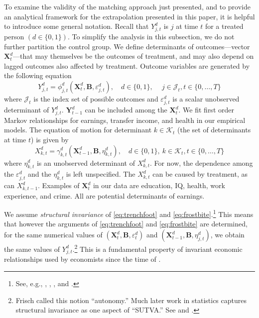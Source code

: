 To examine the validity of the matching approach just presented, and to provide an analytical framework for the extrapolation presented in this paper, it is helpful to introduce some general notation. Recall that $Y^d_{j,t}$ is $j$ at time $t$ for a treated person $(d\in\{0,1\})$. To simplify the analysis in this subsection, we do not further partition the control group. We define determinants of outcomes---vector $\bm{X}^d_t$---that may themselves be the outcomes of treatment, and may also depend on lagged outcomes also affected by treatment. Outcome variables are generated by the following equation
\begin{equation}\label{eq:trenchfoot}
Y^d_{j,t} = \phi^d_{j,t} (\bm{X}^d_t, \bm{B}, \varepsilon^d_{j,t}), \quad d \in \{0,1\}, \quad \  j \in \mathcal{J}_t, t \in \{0,\dots,T\}
\end{equation}
where $\mathcal{J}_t$ is the index set of possible outcomes and $\varepsilon^d_{j,t}$ is a scalar unobserved determinant of $Y^d_{j,t}$. $\bm{Y}^d_{t-1}$ can be included among the $\bm{X}^d_{t}$. We fit first order Markov relationships for earnings, transfer income, and health in our empirical models. The equation of motion for determinant $k \in \mathcal{K}_t$ (the set of determinants at time $t$) is given by
\begin{equation}\label{eq:frostbite}
X^d_{k,t} = \gamma^d_{k,t} (\bm{X}^d_{t-1}, \bm{B}, \eta^d_{k,t}), \quad d \in \{0,1\}, \ k \in \mathcal{K}_t, t \in \{0,\dots,T\}
\end{equation}
where $\eta^d_{k,t}$ is an unobserved determinant of $X^d_{k,t}$. For now, the dependence among the $\varepsilon^d_{j,t}$ and the $\eta^d_{k,t}$ is left unspecified. The $X^d_{k,t}$ can be caused by treatment, as can $X^d_{k,t-1}$. Examples of $\bm{X}^d_t$ in our data are education, IQ, health, work experience, and crime. All are potential determinants of earnings.

We assume \emph{structural invariance} of \eqref{eq:trenchfoot} and \eqref{eq:frostbite}.\footnote{See, e.g., \citet{Frisch_1938_autonomy}, \citet{Haavelmo_1943_Econometrica,Haavelmo_1944_Econometrica}, \citet{Hurwicz_1962_structural}, and \citet{Heckman_Pinto_2015_EconometTheory}.} This means that however the arguments of \eqref{eq:trenchfoot} and \eqref{eq:frostbite} are determined, for the same numerical values of $(\bm{X}^d_t, \bm{B}, \varepsilon^d_t)$ and $(\bm{X}^d_{t-1}, \bm{B}, \eta^d_{j,t})$, we obtain the same values of $Y^d_{j,t}$.\footnote{Frisch called this notion ``autonomy.'' Much later work in statistics captures structural invariance as one aspect of ``SUTVA.'' See \citet{Holland_1986_JASA} and \citet{Heckman_2008_ISR}.} This is a fundamental property of invariant economic relationships used by economists since the time of \citet{Frisch_1938_autonomy}.

